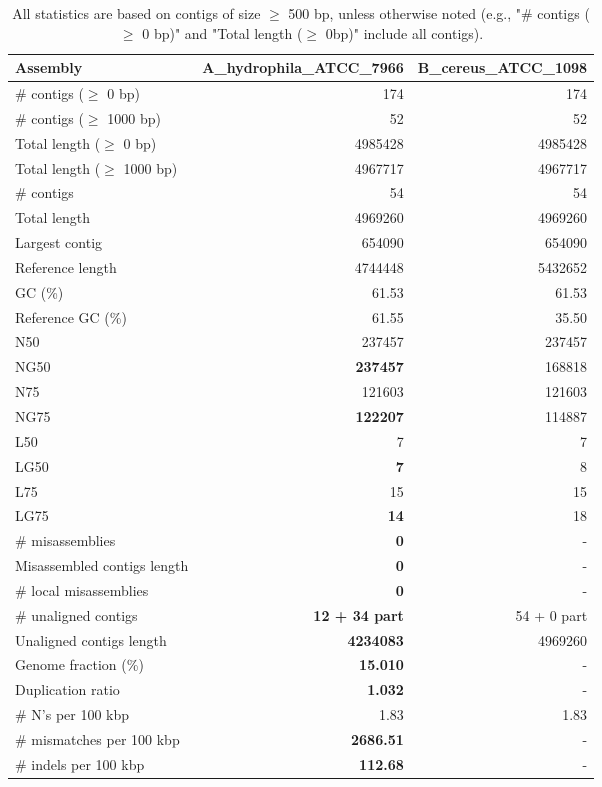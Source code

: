 \documentclass[12pt,a4paper]{article}
\begin{document}
\begin{table}[ht]
\begin{center}
\caption{All statistics are based on contigs of size $\geq$ 500 bp, unless otherwise noted (e.g., "\# contigs ($\geq$ 0 bp)" and "Total length ($\geq$ 0bp)" include all contigs).}
\begin{tabular}{|l*{2}{|r}|}
\hline
Assembly & A\_hydrophila\_ATCC\_7966 & B\_cereus\_ATCC\_1098 \\ \hline
\# contigs ($\geq$ 0 bp) & 174 & 174 \\ \hline
\# contigs ($\geq$ 1000 bp) & 52 & 52 \\ \hline
Total length ($\geq$ 0 bp) & 4985428 & 4985428 \\ \hline
Total length ($\geq$ 1000 bp) & 4967717 & 4967717 \\ \hline
\# contigs & 54 & 54 \\ \hline
Total length & 4969260 & 4969260 \\ \hline
Largest contig & 654090 & 654090 \\ \hline
Reference length & 4744448 & 5432652 \\ \hline
GC (\%) & 61.53 & 61.53 \\ \hline
Reference GC (\%) & 61.55 & 35.50 \\ \hline
N50 & 237457 & 237457 \\ \hline
NG50 & {\bf 237457} & 168818 \\ \hline
N75 & 121603 & 121603 \\ \hline
NG75 & {\bf 122207} & 114887 \\ \hline
L50 & 7 & 7 \\ \hline
LG50 & {\bf 7} & 8 \\ \hline
L75 & 15 & 15 \\ \hline
LG75 & {\bf 14} & 18 \\ \hline
\# misassemblies & {\bf 0} & - \\ \hline
Misassembled contigs length & {\bf 0} & - \\ \hline
\# local misassemblies & {\bf 0} & - \\ \hline
\# unaligned contigs & {\bf 12 + 34 part} & 54 + 0 part \\ \hline
Unaligned contigs length & {\bf 4234083} & 4969260 \\ \hline
Genome fraction (\%) & {\bf 15.010} & - \\ \hline
Duplication ratio & {\bf 1.032} & - \\ \hline
\# N's per 100 kbp & 1.83 & 1.83 \\ \hline
\# mismatches per 100 kbp & {\bf 2686.51} & - \\ \hline
\# indels per 100 kbp & {\bf 112.68} & - \\ \hline
\end{tabular}
\end{center}
\end{table}
\end{document}
